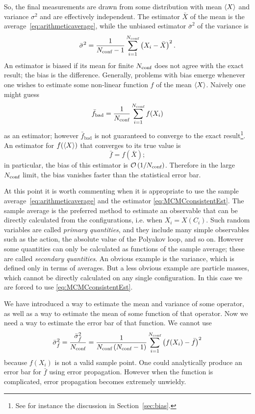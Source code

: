 So, the final measurements are drawn from some
distribution with mean $\ev{X}$ and variance $\sigma^2$
and are effectively independent. The
estimator $\bar{X}$ of the mean is the average~\eqref{eq:arithmeticaverage}, 
while the unbiased estimator $\bar{\sigma}^2$ of the variance is
\begin{equation}\label{eq:estimatorvariance}
  \bar{\sigma}^2=\frac{1}{N_{\text{conf}}-1}\sum_{i=1}^{N_{\text{conf}}}
      \left(X_i-\bar{X}\right)^2.
\end{equation}
An estimator is biased if its mean for finite $N_{\text{conf}}$ 
does not agree with the exact result;
the bias is the difference. Generally, problems with bias emerge whenever
one wishes to estimate some non-linear function $f$ of the mean $\ev{X}$.
Naively one might guess
\begin{equation}
  \bar{f}_\text{bad}=\frac{1}{N_{\text{conf}}}\sum_{i=1}^{N_{\text{conf}}}f(X_i)
\end{equation}
as an estimator; however $\bar{f}_\text{bad}$ is not guaranteed
to converge to the exact result\footnote{See for instance the discussion
in Section~\ref{sec:bias}.}. 
An estimator for $f(\ev{X})$ that converges to its true value is
\begin{equation}\label{eq:MCMCconsistentEst}
  \bar{f}=f(\bar{X});
\end{equation}
in particular, the bias of this estimator is $\operatorname{\mathcal{O}}\left(1/N_{\text{conf}}\right)$.
Therefore in the large $N_{\text{conf}}$ limit, the bias vanishes faster than the 
statistical error bar.

At this point it is worth commenting when it is appropriate to use
the sample average~\eqref{eq:arithmeticaverage} and the estimator
\eqref{eq:MCMCconsistentEst}. The sample average is the preferred 
method to estimate an observable that can be directly calculated from 
the configurations, i.e. when $X_i=X(C_i)$. 
Such random variables are called {\it primary quantities},
 and they include many simple observables such
as the action, the absolute value of the Polyakov loop, and so on. 
However some quantities can only be calculated 
as functions of the sample average; these are called {\it secondary quantities}.
 An obvious example is the variance, which is defined
only in terms of averages. But a less obvious example are particle masses,
which cannot be directly calculated on any single configuration. In this
case we are forced to use \eqref{eq:MCMCconsistentEst}.

We have introduced a way to estimate the mean and variance of some
operator, as well as a way to estimate the mean of some function of
that operator. Now we need a way to estimate the error bar of that
function. We cannot use
\begin{equation}
  \bar{\sigma}^2_{\bar{f}}=\frac{\bar{\sigma}^2_{\bar{f}}}{N_{\text{conf}}}
    =\frac{1}{N_{\text{conf}}\,(N_{\text{conf}}-1)}\sum_{i=1}^{N_{\text{conf}}}
     \left(f(X_i)-\bar{f}\right)^2
\end{equation}
because $f(X_i)$ is not a valid sample point.
One could analytically produce an error bar for $\bar{f}$ 
using error propagation. However when the function is complicated, 
error propagation becomes extremely unwieldy.

